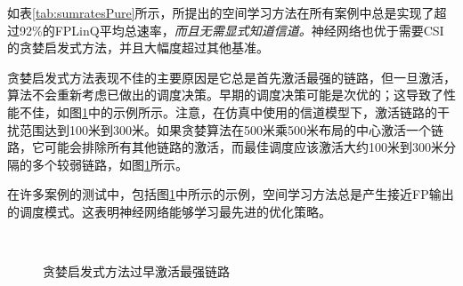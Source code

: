 \documentclass[UTF8, 12pt]{article}
\numberwithin{figure}{section}
\begin{document}
如表\ref{tab:sumratesPure}所示，所提出的空间学习方法在所有案例中总是实现了超过92\%的FPLinQ平均总速率，\emph{而且无需显式知道信道。}神经网络也优于需要CSI的贪婪启发式方法，并且大幅度超过其他基准。

贪婪启发式方法表现不佳的主要原因是它总是首先激活最强的链路，但一旦激活，算法不会重新考虑已做出的调度决策。早期的调度决策可能是次优的；这导致了性能不佳，如图\ref{fig:greedyprematureproblem}中的示例所示。注意，在仿真中使用的信道模型下，激活链路的干扰范围达到100米到300米。如果贪婪算法在500米乘500米布局的中心激活一个链路，它可能会排除所有其他链路的激活，而最佳调度应该激活大约100米到300米分隔的多个较弱链路，如图\ref{fig:greedyprematureproblem}所示。

在许多案例的测试中，包括图\ref{fig:greedyprematureproblem}中所示的示例，空间学习方法总是产生接近FP输出的调度模式。这表明神经网络能够学习最先进的优化策略。

\begin{figure}
  \centering
  \\
\caption{贪婪启发式方法过早激活最强链路}
\label{fig:greedyprematureproblem}
\end{figure}
\end{document}
